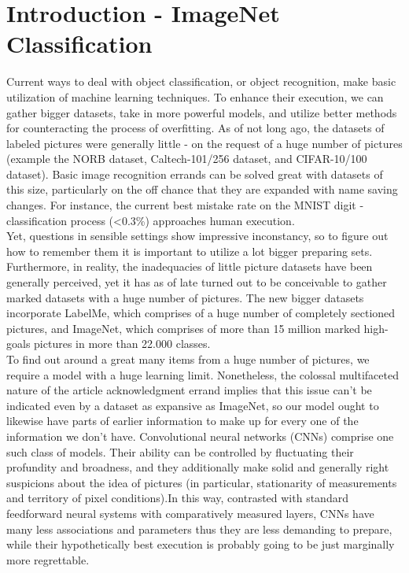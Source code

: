 \documentclass[12pt]{article}
\begin{document}

\section*{Introduction  - ImageNet Classification}
\hspace{10mm}Current ways to deal with object classification, or object recognition, make basic utilization of machine learning techniques. To enhance their execution, we can gather bigger datasets, take in more powerful models, and utilize better methods for counteracting the process of overfitting. As of not long ago, the datasets of labeled pictures were generally little - on the request of a huge number of pictures (example the NORB dataset, Caltech-101/256 dataset, and CIFAR-10/100 dataset). Basic image recognition errands can be solved great with datasets of this size, particularly on the off chance that they are expanded with name saving changes. For instance, the current best mistake rate on the MNIST digit - classification process (<0.3\%) approaches human execution. \\
\hspace*{10mm}Yet, questions in sensible settings show impressive inconstancy, so to figure out how to remember them it is important to utilize a lot bigger preparing sets. Furthermore, in reality, the inadequacies of little picture datasets have been generally perceived, yet it has as of late turned out to be conceivable to gather marked datasets with a huge number of pictures. The new bigger datasets incorporate LabelMe, which comprises of a huge number of completely sectioned pictures, and ImageNet, which comprises of more than 15 million marked high-goals pictures in more than 22.000 classes. \\
\hspace*{10mm}To find out around a great many items from a huge number of pictures, we require a model with a huge learning limit. Nonetheless, the colossal multifaceted nature of the article acknowledgment errand implies that this issue can't be indicated even by a dataset as expansive as ImageNet, so our model ought to likewise have parts of earlier information to make up for every one of the information we don't have. Convolutional neural networks (CNNs) comprise one such class of models. Their ability can be controlled by fluctuating their profundity and broadness, and they additionally make solid and generally right suspicions about the idea of pictures (in particular, stationarity of measurements and territory of pixel conditions).In this way, contrasted with standard feedforward neural systems with comparatively measured layers, CNNs have many less associations and parameters thus they are less demanding to prepare, while their hypothetically best execution is probably going to be just marginally more regrettable. \\
\end{document}
